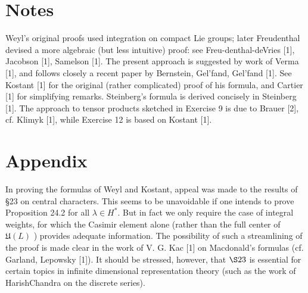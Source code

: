 \documentclass[10pt]{article}
\begin{document}
\section*{Notes}
Weyl's original proofs used integration on compact Lie groups; later Freudenthal devised a more algebraic (but less intuitive) proof: see Freu-denthal-deVries [1], Jacobson [1], Samelson [1]. The present approach is suggested by work of Verma [1], and follows closely a recent paper by Bernstein, Gel'fand, Gel'fand [1]. See Kostant [1] for the original (rather complicated) proof of his formula, and Cartier [1] for simplifying remarks. Steinberg's formula is derived concisely in Steinberg [1]. The approach to tensor products sketched in Exercise 9 is due to Brauer [2], cf. Klimyk [1], while Exercise 12 is based on Kostant [1].

\section*{Appendix}
In proving the formulas of Weyl and Kostant, appeal was made to the results of §23 on central characters. This seems to be unavoidable if one intends to prove Proposition 24.2 for all $\lambda \in H^{*}$. But in fact we only require the case of integral weights, for which the Casimir element alone (rather than the full center of $\mathfrak{U}(L)$ ) provides adequate information. The possibility of such a streamlining of the proof is made clear in the work of V. G. Kac [1] on Macdonald's formulas (cf. Garland, Lepowsky [1]). It should be stressed, however, that $\S 23$ is essential for certain topics in infinite dimensional representation theory (such as the work of HarishChandra on the discrete series).
\end{document}
